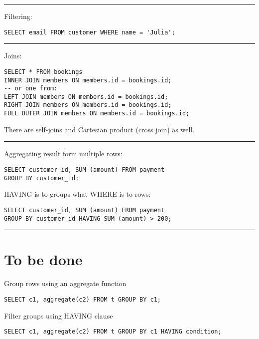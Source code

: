 \documentclass{charun}
\begin{document}
\begin{multicols*}{2}
\hrule

Filtering:
\begin{verbatim}
SELECT email FROM customer WHERE name = 'Julia';
\end{verbatim}

\hrule

Joins:
\begin{verbatim}
SELECT * FROM bookings
INNER JOIN members ON members.id = bookings.id;
-- or one from:
LEFT JOIN members ON members.id = bookings.id;
RIGHT JOIN members ON members.id = bookings.id;
FULL OUTER JOIN members ON members.id = bookings.id;
\end{verbatim}

There are self-joins and Cartesian product (cross join) as well.

\hrule

Aggregating result form multiple rows:
\begin{verbatim}
SELECT customer_id, SUM (amount) FROM payment
GROUP BY customer_id;
\end{verbatim}

HAVING is to groups what WHERE is to rows:
\begin{verbatim}
SELECT customer_id, SUM (amount) FROM payment
GROUP BY customer_id HAVING SUM (amount) > 200;
\end{verbatim}

\hrule

\section{To be done}

Group rows using an aggregate function
\begin{verbatim}
SELECT c1, aggregate(c2) FROM t GROUP BY c1;
\end{verbatim}

Filter groups using HAVING clause
\begin{verbatim}
SELECT c1, aggregate(c2) FROM t GROUP BY c1 HAVING condition;
\end{verbatim}
    

\end{multicols*}
\end{document}
